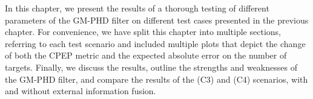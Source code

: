 In this chapter, we present the results of a thorough testing of different parameters of the GM-PHD filter on different test cases presented in the previous chapter. For convenience, we have split this chapter into multiple sections, referring to each test scenario and included multiple plots that depict the change of both the CPEP metric and the expected absolute error on the number of targets. Finally, we discuss the results, outline the strengths and weaknesses of the GM-PHD filter, and compare the results of the (C3) and (C4) scenarios, with and without external information fusion.
